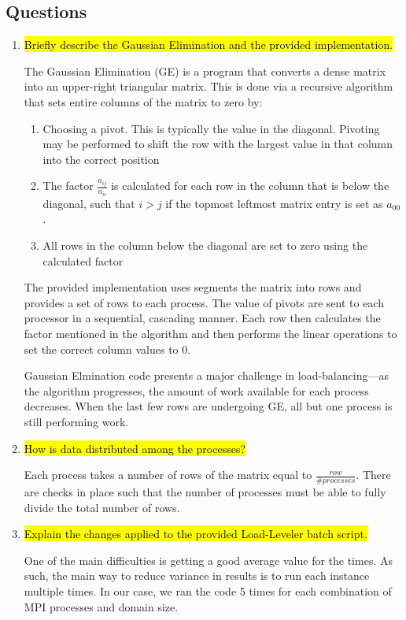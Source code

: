 \subsection{Questions}
\begin{enumerate}
	\item \hl{Briefly describe the Gaussian Elimination and the provided implementation.}

	The Gaussian Elimination (GE) is a program that converts a dense matrix into an upper-right triangular matrix. This is done via a recursive algorithm that sets entire columns of the matrix to zero by:
\begin{enumerate}
\item Choosing a pivot. This is typically the value in the diagonal. Pivoting may be performed to shift the row with the largest value in that column into the correct position
\item The factor $\frac{a_{ij}}{a_{ii}}$ is calculated for each row in the column that is below the diagonal, such that $i > j$ if the topmost leftmost matrix entry is set as $a_{00}$.
\item All rows in the column below the diagonal are set to zero using the calculated factor
\end{enumerate}

The provided implementation uses segments the matrix into rows and provides a set of rows to each process. The value of pivots are sent to each processor in a sequential, cascading manner. Each row then calculates the factor mentioned in the algorithm and then performs the linear operations to set the correct column values to 0.

Gaussian Elmination code presents a major challenge in load-balancing---as the algorithm progresses, the amount of work available for each process decreases. When the last few rows are undergoing GE, all but one process is still performing work. 

	\item \hl{How is data distributed among the processes?}

	Each process takes a number of rows of the matrix equal to $\frac{row}{\#processes}$. There are checks in place such that the number of processes must be able to fully divide the total number of rows.

	\item \hl{Explain the changes applied to the provided Load-Leveler batch script.}

	One of the main difficulties is getting a good average value for the times. As such, the main way to reduce variance in results is to run each instance multiple times. In our case, we ran the code 5 times for each combination of MPI processes and domain size.


\end{enumerate}
